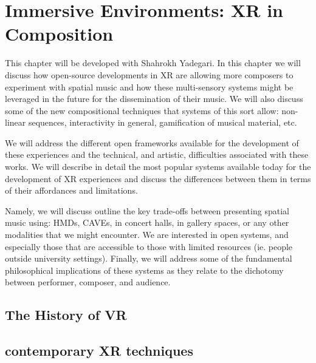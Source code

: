 \chapter{Immersive Environments: XR in Composition}
\label{ch:xr-mus}





This chapter will be developed with Shahrokh Yadegari. In this chapter we will discuss how open-source developments in XR are allowing more composers to experiment with spatial music and how these multi-sensory systems might be leveraged in the future for the dissemination of their music. We will also discuss some of the new compositional techniques that systems of this sort allow: non-linear sequences, interactivity in general, gamification of musical material, etc. 

We will address the different open frameworks available for the development of these experiences and the technical, and artistic, difficulties associated with these works. We will describe in detail the most popular systems available today for the development of XR experiences and discuss the differences between them in terms of their affordances and limitations.

Namely, we will discuss outline the key trade-offs between presenting spatial music using: HMDs, CAVEs, in concert halls, in gallery spaces, or any other modalities that we might encounter. We are interested in open systems, and especially those that are accessible to those with limited resources (ie. people outside university settings). Finally, we will address some of the fundamental philosophical implications of these systems as they relate to the dichotomy between performer, composer, and audience. 
\section{The History of VR}

\section{contemporary XR techniques}

